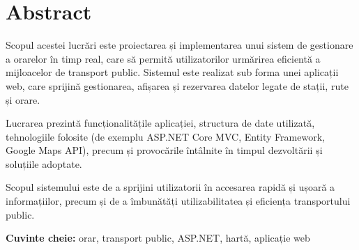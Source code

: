\section*{Abstract}

Scopul acestei lucrări este proiectarea și implementarea unui sistem de gestionare a orarelor în timp real, care să permită utilizatorilor urmărirea eficientă a mijloacelor de transport public. Sistemul este realizat sub forma unei aplicații web, care sprijină gestionarea, afișarea și rezervarea datelor legate de stații, rute și orare.

Lucrarea prezintă funcționalitățile aplicației, structura de date utilizată, tehnologiile folosite (de exemplu ASP.NET Core MVC, Entity Framework, Google Maps API), precum și provocările întâlnite în timpul dezvoltării și soluțiile adoptate.

Scopul sistemului este de a sprijini utilizatorii în accesarea rapidă și ușoară a informațiilor, precum și de a îmbunătăți utilizabilitatea și eficiența transportului public.

\vspace{1cm}

\noindent\textbf{Cuvinte cheie:} orar, transport public, ASP.NET, hartă, aplicație web
